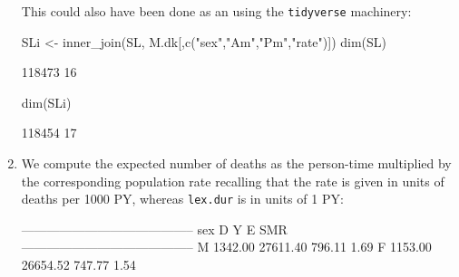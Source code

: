 \begin{enumerate}[resume]
This could also have been done as an  using the
\texttt{tidyverse} machinery:
\begin{Schunk}
\begin{Sinput}
 SLi <- inner_join(SL, M.dk[,c("sex","Am","Pm","rate")])
 dim(SL)
\end{Sinput}
\begin{Soutput}
[1] 118473     16
\end{Soutput}
\begin{Sinput}
 dim(SLi)
\end{Sinput}
\begin{Soutput}
[1] 118454     17
\end{Soutput}
\end{Schunk}


\item We compute the expected number of deaths as the person-time
   multiplied by the corresponding population rate recalling that the
   rate is given in units of deaths per 1000 PY, whereas
   \texttt{lex.dur} is in units of 1 PY:
\begin{Schunk}
\begin{Soutput}
 ----------------------------------------- 
 sex           D        Y       E     SMR  
 ----------------------------------------- 
 M       1342.00 27611.40  796.11    1.69  
 F       1153.00 26654.52  747.77    1.54  
                                           

\end{Soutput}
\end{Schunk}
\end{enumerate}
